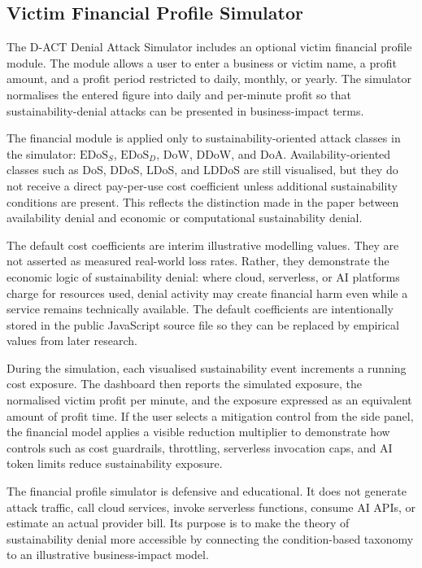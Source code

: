 \subsection{Victim Financial Profile Simulator}
\label{app:victim_financial_profile_simulator}

The D-ACT Denial Attack Simulator includes an optional victim financial profile module. The module allows a user to enter a business or victim name, a profit amount, and a profit period restricted to daily, monthly, or yearly. The simulator normalises the entered figure into daily and per-minute profit so that sustainability-denial attacks can be presented in business-impact terms.

The financial module is applied only to sustainability-oriented attack classes in the simulator: \(\text{EDoS}_{S}\), \(\text{EDoS}_{D}\), DoW, DDoW, and DoA. Availability-oriented classes such as DoS, DDoS, LDoS, and LDDoS are still visualised, but they do not receive a direct pay-per-use cost coefficient unless additional sustainability conditions are present. This reflects the distinction made in the paper between availability denial and economic or computational sustainability denial.

The default cost coefficients are interim illustrative modelling values. They are not asserted as measured real-world loss rates. Rather, they demonstrate the economic logic of sustainability denial: where cloud, serverless, or AI platforms charge for resources used, denial activity may create financial harm even while a service remains technically available. The default coefficients are intentionally stored in the public JavaScript source file so they can be replaced by empirical values from later research.

During the simulation, each visualised sustainability event increments a running cost exposure. The dashboard then reports the simulated exposure, the normalised victim profit per minute, and the exposure expressed as an equivalent amount of profit time. If the user selects a mitigation control from the side panel, the financial model applies a visible reduction multiplier to demonstrate how controls such as cost guardrails, throttling, serverless invocation caps, and AI token limits reduce sustainability exposure.

The financial profile simulator is defensive and educational. It does not generate attack traffic, call cloud services, invoke serverless functions, consume AI APIs, or estimate an actual provider bill. Its purpose is to make the theory of sustainability denial more accessible by connecting the condition-based taxonomy to an illustrative business-impact model.
